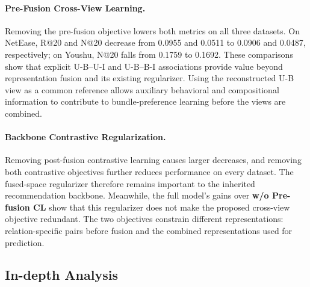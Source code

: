 \documentclass[letterpaper]{article}
\begin{document}
\paragraph{Pre-Fusion Cross-View Learning.}
Removing the pre-fusion objective lowers both metrics on all
three datasets. On NetEase, R@20 and N@20 decrease from
0.0955 and 0.0511 to 0.0906 and 0.0487, respectively; on
Youshu, N@20 falls from 0.1759 to 0.1692. These comparisons
show that explicit U-B--U-I and U-B--B-I associations provide
value beyond representation fusion and its existing
regularizer. Using the reconstructed U-B view as a common
reference allows auxiliary behavioral and compositional
information to contribute to bundle-preference learning
before the views are combined.

\paragraph{Backbone Contrastive Regularization.}
Removing post-fusion contrastive learning causes larger
decreases, and removing both contrastive objectives further
reduces performance on every dataset. The fused-space
regularizer therefore remains important to the inherited
recommendation backbone. Meanwhile, the full model's gains
over \textbf{w/o Pre-fusion CL} show that this regularizer does
not make the proposed cross-view objective redundant. The
two objectives constrain different representations:
relation-specific pairs before fusion and the combined
representations used for prediction.


\subsection{In-depth Analysis}
\end{document}
